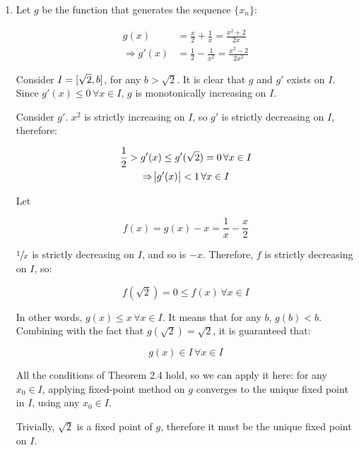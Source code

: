 \documentclass[../../../../Assignments]{subfiles}
\begin{document}
\begin{solution}
    \begin{enumerate}[label = \alph*)]
        \item Let \(g\) be the function that generates the sequence \(\{x_n\}\):

            \begin{align*}
                             g(x) &= \frac{x}{2} + \frac{1}{x} = \frac{x^2 + 2}{2x} \\
                \Rightarrow g'(x) &= \frac{1}{2} - \frac{1}{x^2} = \frac{x^2 - 2}{2x^2}
            \end{align*}

            Consider \(I = \interval{\sqrt{2}}{b}\), for any \(b > \sqrt{2}\).
            It is clear that \(g\) and \(g'\) exists on \(I\). Since \(g'(x) \leq
            0 \, \forall x \in I\), \(g\) is monotonically increasing on \(I\).

            Consider \(g'\). \(x^2\) is strictly increasing on \(I\), so \(g'\)
            is strictly decreasing on \(I\), therefore:

            \begin{gather*}
                \frac{1}{2} > g'(x) \leq g'(\sqrt{2}) = 0 \, \forall x \in I \\
                \Rightarrow \abs{g'(x)} < 1 \, \forall x \in I
            \end{gather*}

            Let

            \[f(x) = g(x) - x = \frac{1}{x} - \frac{x}{2}\]

            \(\sfrac{1}{x}\) is strictly decreasing on \(I\), and so is \(-x\).
            Therefore, \(f\) is strictly decreasing on \(I\), so:

            \[f(\sqrt{2}) = 0 \leq f(x) \, \forall x \in I\]

            In other words, \(g(x) \leq x \, \forall x \in I\). It means that
            for any \(b\), \(g(b) < b\). Combining with the fact that
            \(g(\sqrt{2}) = \sqrt{2}\), it is guaranteed that:

            \[g(x) \in I \, \forall x \in I\]

            All the conditions of Theorem 2.4 hold, so we can apply it here: for
            any \(x_0 \in I\), applying fixed-point method on \(g\) converges to
            the unique fixed point in \(I\), using any \(x_0 \in I\).

            Trivially, \(\sqrt{2}\) is a fixed point of \(g\), therefore it must
            be the unique fixed point on \(I\).


\end{enumerate}
\end{solution}
\end{document}
